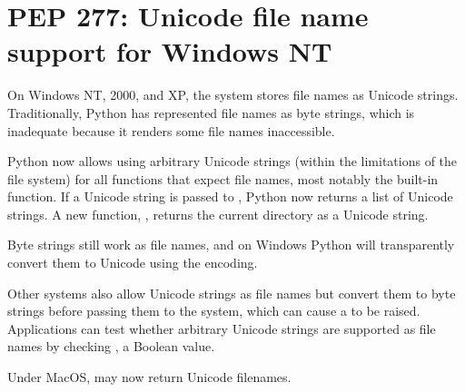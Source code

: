 \documentclass{howto}
\begin{document}
\begin{seealso}


\end{seealso}

\section{PEP 277: Unicode file name support for Windows NT}

On Windows NT, 2000, and XP, the system stores file names as Unicode
strings. Traditionally, Python has represented file names as byte
strings, which is inadequate because it renders some file names
inaccessible.

Python now allows using arbitrary Unicode strings (within the
limitations of the file system) for all functions that expect file
names, most notably the  built-in function. If a Unicode
string is passed to , Python now returns a list
of Unicode strings.  A new function, , returns
the current directory as a Unicode string.

Byte strings still work as file names, and on Windows Python will
transparently convert them to Unicode using the  encoding.

Other systems also allow Unicode strings as file names but convert
them to byte strings before passing them to the system, which can
cause a  to be raised. Applications can test
whether arbitrary Unicode strings are supported as file names by
checking , a Boolean value.

Under MacOS,  may now return Unicode filenames.

\begin{seealso}


\end{seealso}
\end{document}
